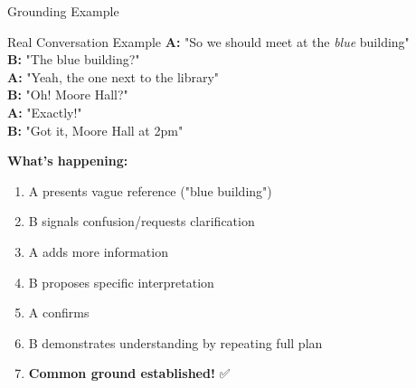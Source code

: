 \documentclass[aspectratio=169]{beamer}
\begin{document}
\begin{frame}[shrink=10]{Grounding Example 💬}
\small
    \begin{block}{Real Conversation Example}
        \textbf{A:} "So we should meet at the \textit{blue} building" \\
        \textbf{B:} "The blue building?" \\
        \textbf{A:} "Yeah, the one next to the library" \\
        \textbf{B:} "Oh! Moore Hall?" \\
        \textbf{A:} "Exactly!" \\
        \textbf{B:} "Got it, Moore Hall at 2pm"
    \end{block}

    \vspace{0.3cm}

    \textbf{What's happening:}
    \begin{enumerate}\setlength{\itemsep}{0pt}
        \item A presents vague reference ("blue building")
        \item B signals confusion/requests clarification
        \item A adds more information
        \item B proposes specific interpretation
        \item A confirms
        \item B demonstrates understanding by repeating full plan
        \item \textbf{Common ground established!} ✅
    \end{enumerate}
\end{frame}
\end{document}
